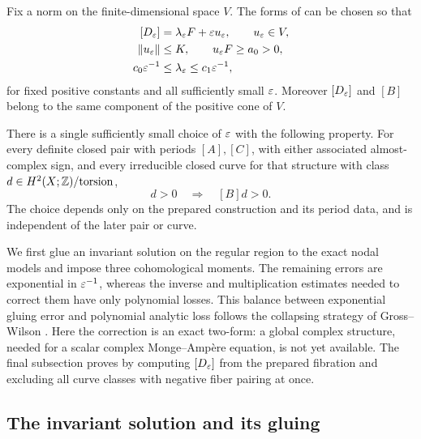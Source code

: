 \begin{proposition}
\label{prop:auxiliary-class}
Fix a norm on the finite-dimensional space $V$.  The forms of
 can be chosen so that
\begin{equation}
\begin{split}
  [D_\varepsilon]&=\lambda_\varepsilon F+\varepsilon u_\varepsilon,\qquad u_\varepsilon\in V,\\
  \|u_\varepsilon\|&\le K,\qquad u_\varepsilon F\ge a_0>0,\\
  c_0\varepsilon^{-1}&\le\lambda_\varepsilon\le c_1\varepsilon^{-1},
\end{split}
\label{eq:auxiliary-class-expansion}
\end{equation}
for fixed positive constants and all sufficiently small $\varepsilon$.
Moreover $[D_\varepsilon]$ and $[B]$ belong to the same component of the
positive cone of $V$.

There is a single sufficiently small choice of $\varepsilon$ with the
following property.  For every definite closed pair with periods
$[A],[C]$, with either associated almost-complex sign, and every
irreducible closed curve for that structure with class
$d\in H^2(X;\mathbb Z)/\mathrm{torsion}$,
\begin{equation}
  [D_\eps]d>0\quad\Longrightarrow\quad[B]d>0.
  \label{eq:auxiliary-uniform-transfer}
\end{equation}
The choice depends only on the prepared construction and its period
data, and is independent of the later pair or curve.
\end{proposition}

We first glue an invariant solution on the regular region to the exact
nodal models and impose three cohomological moments.  The remaining
errors are exponential in $\varepsilon^{-1}$, whereas the inverse and
multiplication estimates needed to correct them have only polynomial
losses.  This balance between exponential gluing error and polynomial
analytic loss follows the collapsing strategy of Gross--Wilson
\cite[Sections~4--5]{GrossWilson2000}.  Here the correction is an exact
two-form: a global complex structure, needed for a scalar complex
Monge--Amp\`ere equation, is not yet available.  The final subsection
proves  by computing $[D_\varepsilon]$ from the
prepared fibration and excluding all curve classes with negative fiber
pairing at once.

\subsection{The invariant solution and its gluing}

